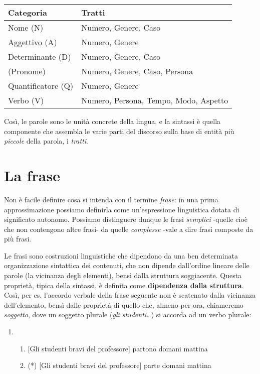 \documentclass[a4paper,twoside,11pt,chapterprefix=false,bibliography=totocnumbered,listof=flat]{scrbook}
\providecommand{\tightlist}{%
  \setlength{\itemsep}{0pt}\setlength{\parskip}{0pt}}
\begin{document}
\begin{longtable}[]{@{}ll@{}}
\toprule
Categoria & Tratti\tabularnewline
\midrule
\endhead
Nome (N) & Numero, Genere, Caso\tabularnewline
Aggettivo (A) & Numero, Genere\tabularnewline
Determinante (D) & Numero, Genere, Caso\tabularnewline
(Pronome) & Numero, Genere, Caso, Persona\tabularnewline
Quantificatore (Q) & Numero, Genere\tabularnewline
Verbo (V) & Numero, Persona, Tempo, Modo, Aspetto\tabularnewline
\bottomrule
\end{longtable}

Così, le parole sono le unità concrete della lingua, e la sintassi è
quella componente che assembla le varie parti del discorso sulla base di
entità più \emph{piccole} della parola, i \emph{tratti}.

\hypertarget{la-frase}{%
\chapter{La frase}\label{la-frase}}

Non è facile definire cosa si intenda con il termine \emph{frase}: in
una prima approssimazione possiamo definirla come un'espressione
linguistica dotata di significato autonomo. Possiamo distinguere dunque
le frasi \emph{semplici} -quelle cioè che non contengono altre frasi- da
quelle \emph{complesse} -vale a dire frasi composte da più frasi.

Le frasi sono costruzioni linguistiche che dipendono da una ben
determinata organizzazione sintattica dei contenuti, che non dipende
dall'ordine lineare delle parole (la vicinanza degli elementi), bensì
dalla struttura soggiacente. Questa proprietà, tipica della sintassi, è
definita come \textbf{dipendenza dalla struttura}. Così, per es.
l'accordo verbale della frase seguente non è scatenato dalla vicinanza
dell'elemento, bensì dalle proprietà di quello che, almeno per ora,
chiameremo \emph{soggetto}, dove un soggetto plurale (\emph{gli
studenti\ldots{}}) si accorda ad un verbo plurale:

\begin{enumerate}
\def\labelenumi{(\arabic{enumi})}
\setcounter{enumi}{7}
\item
  \begin{enumerate}
  \def\labelenumii{\alph{enumii}.}
  \tightlist
  \item
    {[}Gli studenti bravi del professore{]} partono domani mattina
  \item
    (*) {[}Gli studenti bravi del professore{]} parte domani mattina
  \end{enumerate}
\end{enumerate}
\end{document}
